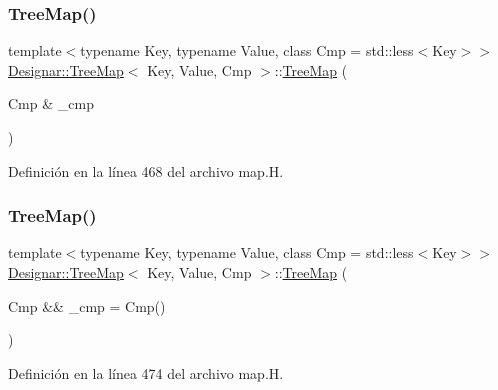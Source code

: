 \subsubsection{\texorpdfstring{Tree\+Map()}{TreeMap()}\hspace{0.1cm}{\footnotesize\ttfamily [2/7]}}
{\footnotesize\ttfamily template$<$typename Key, typename Value, class Cmp = std\+::less$<$\+Key$>$$>$ \\
\hyperlink{class_designar_1_1_tree_map}{Designar\+::\+Tree\+Map}$<$ Key, Value, Cmp $>$\+::\hyperlink{class_designar_1_1_tree_map}{Tree\+Map} (\begin{DoxyParamCaption}\item[{Cmp \&}]{\+\_\+cmp }\end{DoxyParamCaption})\hspace{0.3cm}{\ttfamily [inline]}}



Definición en la línea 468 del archivo map.\+H.

\mbox{\label{class_designar_1_1_tree_map_a10fa15275739543d0a7bc6470c0639dc}} 
\subsubsection{\texorpdfstring{Tree\+Map()}{TreeMap()}\hspace{0.1cm}{\footnotesize\ttfamily [3/7]}}
{\footnotesize\ttfamily template$<$typename Key, typename Value, class Cmp = std\+::less$<$\+Key$>$$>$ \\
\hyperlink{class_designar_1_1_tree_map}{Designar\+::\+Tree\+Map}$<$ Key, Value, Cmp $>$\+::\hyperlink{class_designar_1_1_tree_map}{Tree\+Map} (\begin{DoxyParamCaption}\item[{Cmp \&\&}]{\+\_\+cmp = {\ttfamily Cmp()} }\end{DoxyParamCaption})\hspace{0.3cm}{\ttfamily [inline]}}



Definición en la línea 474 del archivo map.\+H.

\mbox{\label{class_designar_1_1_tree_map_a59cf2c9babbf20a9db85f133aa15dfd5}} 
